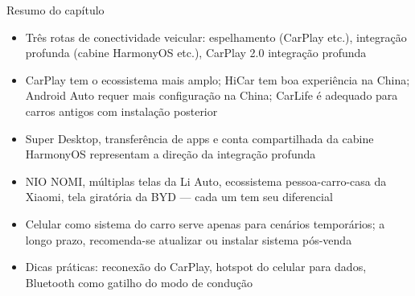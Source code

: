 \begin{tcbsummary}{Resumo do capítulo}
\begin{itemize}
  \item Três rotas de conectividade veicular: espelhamento (CarPlay etc.), integração profunda (cabine HarmonyOS etc.), CarPlay 2.0 integração profunda
  \item CarPlay tem o ecossistema mais amplo; HiCar tem boa experiência na China; Android Auto requer mais configuração na China; CarLife é adequado para carros antigos com instalação posterior
  \item Super Desktop, transferência de apps e conta compartilhada da cabine HarmonyOS representam a direção da integração profunda
  \item NIO NOMI, múltiplas telas da Li Auto, ecossistema pessoa-carro-casa da Xiaomi, tela giratória da BYD — cada um tem seu diferencial
  \item Celular como sistema do carro serve apenas para cenários temporários; a longo prazo, recomenda-se atualizar ou instalar sistema pós-venda
  \item Dicas práticas: reconexão do CarPlay, hotspot do celular para dados, Bluetooth como gatilho do modo de condução
\end{itemize}

\end{tcbsummary}
